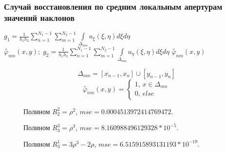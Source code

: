 \documentclass{article}
\begin{document}
\subsubsection{Случай восстановления по средним локальным апертурам значений наклонов}
$g_1 = \frac{1}{h_1h_2} \sum \limits_{n=1}^{N_1 - 1} \sum \limits_{m=1}^{N_2 - 1} \int \limits _{\Delta_{nm}} u_\xi(\xi,\eta) d\xi d\eta$ $\overset{\circ}{\varphi}_{nm}(x,y);\;g_2 = \frac{1}{h_1h_2} \sum \limits_{n=1}^{N_1 - 1} \sum \limits_{m=1}^{N_2 - 1} \int \limits _{\Delta_{nm}} u_\eta(\xi,\eta) d\xi d\eta$ $\overset{\circ}{\varphi}_{nm}(x,y)$ 

$$\Delta_{nm} = [x_{n-1}, x_n] \cup [y_{n-1}, y_n] $$
$$\overset{\circ}{\varphi}_{nm}(x,y) = \begin{cases} 1, \, x \in \Delta_{nm} \\ 0, \, else\end{cases}$$
\begin{figure}[H]
\caption{Полином $R_2^2 = \rho^2$, $mse = 0.0004513972414769472$.}
\end{figure}

\begin{figure}[H]
\caption{Полином $R_3^3 = \rho^3$, $mse = 8.160988496129328*10^{-5}$.}
\end{figure}

\begin{figure}[H]
\caption{Полином $R_3^1 = 3\rho^3 - 2\rho$, $mse = 6.515915893131193*10^{-19}$.}
\end{figure}
\end{document}
